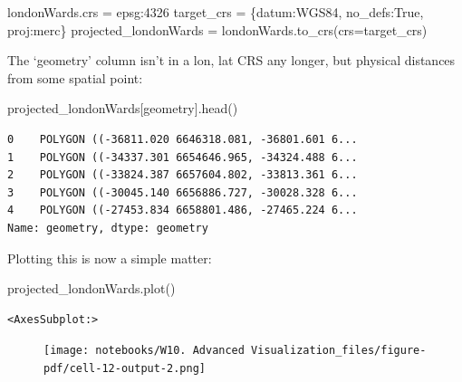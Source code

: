 \documentclass[
  letterpaper,
  DIV=11,
  numbers=noendperiod]{scrreprt}
\newenvironment{Shaded}{\begin{snugshade}}{\end{snugshade}}
\newcommand{\NormalTok}[1]{\textcolor[rgb]{0.00,0.23,0.31}{#1}}
\newcommand{\OperatorTok}[1]{\textcolor[rgb]{0.37,0.37,0.37}{#1}}
\newcommand{\StringTok}[1]{\textcolor[rgb]{0.13,0.47,0.30}{#1}}
\newcommand{\VariableTok}[1]{\textcolor[rgb]{0.07,0.07,0.07}{#1}}
\begin{document}
\begin{Shaded}
\begin{Highlighting}[]
\NormalTok{londonWards.crs }\OperatorTok{=} \StringTok{\textquotesingle{}epsg:4326\textquotesingle{}}
\NormalTok{target\_crs }\OperatorTok{=}\NormalTok{ \{}\StringTok{\textquotesingle{}datum\textquotesingle{}}\NormalTok{:}\StringTok{\textquotesingle{}WGS84\textquotesingle{}}\NormalTok{, }\StringTok{\textquotesingle{}no\_defs\textquotesingle{}}\NormalTok{:}\VariableTok{True}\NormalTok{, }\StringTok{\textquotesingle{}proj\textquotesingle{}}\NormalTok{:}\StringTok{\textquotesingle{}merc\textquotesingle{}}\NormalTok{\}}
\NormalTok{projected\_londonWards }\OperatorTok{=}\NormalTok{ londonWards.to\_crs(crs}\OperatorTok{=}\NormalTok{target\_crs)}
\end{Highlighting}
\end{Shaded}

The `geometry' column isn't in a lon, lat CRS any longer, but physical
distances from some spatial point:

\begin{Shaded}
\begin{Highlighting}[]
\NormalTok{projected\_londonWards[}\StringTok{\textquotesingle{}geometry\textquotesingle{}}\NormalTok{].head()}
\end{Highlighting}
\end{Shaded}

\begin{verbatim}
0    POLYGON ((-36811.020 6646318.081, -36801.601 6...
1    POLYGON ((-34337.301 6654646.965, -34324.488 6...
2    POLYGON ((-33824.387 6657604.802, -33813.361 6...
3    POLYGON ((-30045.140 6656886.727, -30028.328 6...
4    POLYGON ((-27453.834 6658801.486, -27465.224 6...
Name: geometry, dtype: geometry
\end{verbatim}

Plotting this is now a simple matter:

\begin{Shaded}
\begin{Highlighting}[]
\NormalTok{projected\_londonWards.plot()}
\end{Highlighting}
\end{Shaded}

\begin{verbatim}
<AxesSubplot:>
\end{verbatim}

\begin{figure}[H]

{\centering \texttt{[image: notebooks/W10. Advanced Visualization\_files/figure-pdf/cell-12-output-2.png]}

}

\end{figure}
\end{document}
